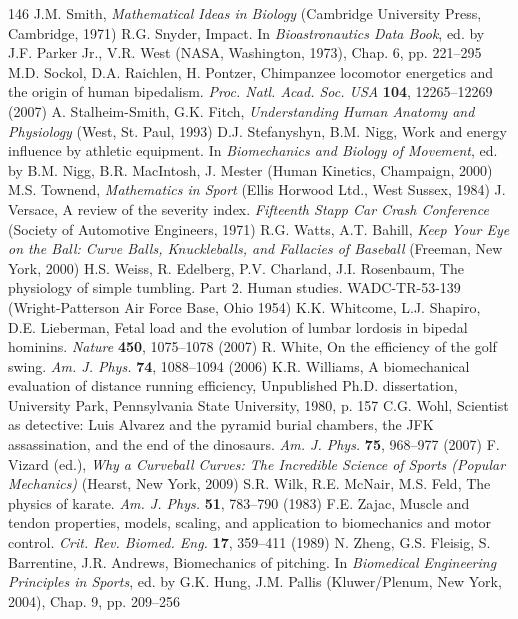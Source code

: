 \documentclass[12pt]{book}
\begin{document}
\begin{thebibliography}{146}
 J.M. Smith, \textit{Mathematical Ideas in Biology} (Cambridge University Press, Cambridge, 1971)
 R.G. Snyder, Impact. In \textit{Bioastronautics Data Book}, ed. by J.F. Parker Jr., V.R. West (NASA, Washington, 1973), Chap. 6, pp. 221--295
 M.D. Sockol, D.A. Raichlen, H. Pontzer, Chimpanzee locomotor energetics and the origin of human bipedalism. \textit{Proc. Natl. Acad. Soc. USA} \textbf{104}, 12265--12269 (2007)
 A. Stalheim-Smith, G.K. Fitch, \textit{Understanding Human Anatomy and Physiology} (West, St. Paul, 1993)
 D.J. Stefanyshyn, B.M. Nigg, Work and energy influence by athletic equipment. In \textit{Biomechanics and Biology of Movement}, ed. by B.M. Nigg, B.R. MacIntosh, J. Mester (Human Kinetics, Champaign, 2000)
 M.S. Townend, \textit{Mathematics in Sport} (Ellis Horwood Ltd., West Sussex, 1984)
 J. Versace, A review of the severity index. \textit{Fifteenth Stapp Car Crash Conference} (Society of Automotive Engineers, 1971)
 R.G. Watts, A.T. Bahill, \textit{Keep Your Eye on the Ball: Curve Balls, Knuckleballs, and Fallacies of Baseball} (Freeman, New York, 2000)
 H.S. Weiss, R. Edelberg, P.V. Charland, J.I. Rosenbaum, The physiology of simple tumbling. Part 2. Human studies. WADC-TR-53-139 (Wright-Patterson Air Force Base, Ohio 1954)
 K.K. Whitcome, L.J. Shapiro, D.E. Lieberman, Fetal load and the evolution of lumbar lordosis in bipedal hominins. \textit{Nature} \textbf{450}, 1075--1078 (2007)
 R. White, On the efficiency of the golf swing. \textit{Am. J. Phys.} \textbf{74}, 1088--1094 (2006)
 K.R. Williams, A biomechanical evaluation of distance running efficiency, Unpublished Ph.D. dissertation, University Park, Pennsylvania State University, 1980, p. 157
 C.G. Wohl, Scientist as detective: Luis Alvarez and the pyramid burial chambers, the JFK assassination, and the end of the dinosaurs. \textit{Am. J. Phys.} \textbf{75}, 968--977 (2007)
 F. Vizard (ed.), \textit{Why a Curveball Curves: The Incredible Science of Sports (Popular Mechanics)} (Hearst, New York, 2009)
 S.R. Wilk, R.E. McNair, M.S. Feld, The physics of karate. \textit{Am. J. Phys.} \textbf{51}, 783--790 (1983)
 F.E. Zajac, Muscle and tendon properties, models, scaling, and application to biomechanics and motor control. \textit{Crit. Rev. Biomed. Eng.} \textbf{17}, 359--411 (1989)
 N. Zheng, G.S. Fleisig, S. Barrentine, J.R. Andrews, Biomechanics of pitching. In \textit{Biomedical Engineering Principles in Sports}, ed. by G.K. Hung, J.M. Pallis (Kluwer/Plenum, New York, 2004), Chap. 9, pp. 209--256
\end{thebibliography}

\end{document}
